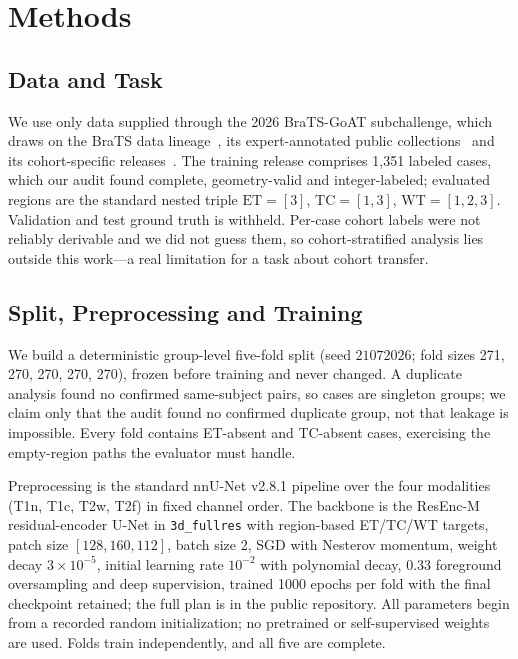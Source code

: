 \documentclass[runningheads]{llncs}
\begin{document}
\section{Methods}

\subsection{Data and Task}
We use only data supplied through the 2026 BraTS-GoAT subchallenge, which draws on the BraTS data
lineage~\cite{menze2015brats,bakas2017advancing,baid2021brats}, its expert-annotated public
collections~\cite{bakas2017gbm,bakas2017lgg} and its cohort-specific
releases~\cite{bratsmen2023,bratsmet2023,bratsped2023,bratsssa2023}. The training release comprises
1{,}351 labeled cases, which our audit found complete, geometry-valid and integer-labeled; evaluated
regions are the standard nested triple $\mathrm{ET}=[3]$, $\mathrm{TC}=[1,3]$, $\mathrm{WT}=[1,2,3]$.
Validation and test ground truth is withheld. Per-case cohort labels were not reliably derivable and
we did not guess them, so cohort-stratified analysis lies outside this work---a real limitation for a
task about cohort transfer.

\subsection{Split, Preprocessing and Training}
We build a deterministic group-level five-fold split (seed $21072026$; fold sizes 271, 270, 270, 270,
270), frozen before training and never changed. A duplicate analysis found no confirmed same-subject
pairs, so cases are singleton groups; we claim only that the audit found no confirmed duplicate
group, not that leakage is impossible. Every fold contains ET-absent and
TC-absent cases, exercising the empty-region paths the evaluator must handle.

Preprocessing is the standard nnU-Net v2.8.1 pipeline over the four modalities (T1n, T1c, T2w, T2f)
in fixed channel order. The backbone is the ResEnc-M residual-encoder U-Net in
\texttt{3d\_fullres} with region-based ET/TC/WT targets, patch size $[128,160,112]$, batch size 2,
SGD with Nesterov momentum, weight decay $3\times10^{-5}$, initial learning rate $10^{-2}$ with
polynomial decay, 0.33 foreground
oversampling and deep supervision, trained 1000 epochs per fold with the final checkpoint retained;
the full plan is in the public repository. All parameters begin from a recorded random
initialization; no pretrained or self-supervised weights are used. Folds train independently, and all
five are complete.
\end{document}
